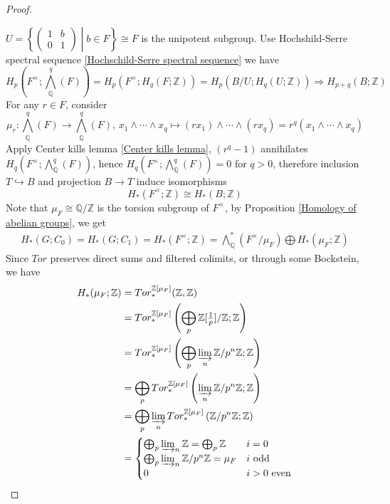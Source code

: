 \documentclass[../main.tex]{subfiles}
\begin{document}
\begin{proof}
\begin{center}
\begin{tikzcd}
\end{tikzcd}
\end{center}
$U=\left\{\begin{pmatrix}
1&b \\
0&1
\end{pmatrix}\middle|b\in F\right\}\cong F$ is the unipotent subgroup. Use Hochshild-Serre spectral sequence \ref{Hochschild-Serre spectral sequence} we have
\[H_p(F^\times;\textstyle\bigwedge_{\mathbb Q}^q(F))=H_p(F^\times;H_q(F;\mathbb Z))=H_p(B/U;H_q(U;\mathbb Z))\Rightarrow H_{p+q}(B;\mathbb Z)\]
For any $r\in F$, consider
\[\mu_r:\textstyle\bigwedge_{\mathbb Q}^q(F)\to\bigwedge_{\mathbb Q}^q(F),\,x_1\wedge\cdots\wedge x_q\mapsto (rx_1)\wedge\cdots\wedge (rx_q)=r^q(x_1\wedge\cdots\wedge x_q)\]
Apply Center kills lemma \ref{Center kills lemma}, $(r^q-1)$ annihilates $H_q(F^\times;\bigwedge_{\mathbb Q}^q(F))$, hence $H_q(F^\times;\bigwedge_{\mathbb Q}^q(F))=0$ for $q>0$, therefore inclusion $T\hookrightarrow B$ and projection $B\to T$ induce isomorphisms
\[H_*(F^\times;\mathbb Z)\cong H_*(B;\mathbb Z)\]
Note that $\mu_{F}\cong\mathbb Q/\mathbb Z$ is the torsion subgroup of $F^\times$, by Proposition \ref{Homology of abelian groups}, we get
\begin{align*}
H_*(G;C_0)=H_*(G;C_1)=H_*(F^\times;\mathbb Z)=\textstyle\bigwedge^*_{\mathbb Q}(F^\times/\mu_{F})\bigoplus H_*(\mu_{F};\mathbb Z)
\end{align*}
Since $Tor$ preserves direct sums and filtered colimits, or through some Bockstein, we have
\begin{align*}
H_*(\mu_{F};\mathbb Z)&= Tor^{\mathbb Z[\mu_{F}]}_*(\mathbb Z,\mathbb Z) \\
&=Tor^{\mathbb Z[\mu_{F}]}_*\left(\bigoplus_p\mathbb Z[\textstyle\frac{1}{p}]/\mathbb Z;\mathbb Z\right) \\
&=Tor^{\mathbb Z[\mu_{F}]}_*\left(\bigoplus_p\varinjlim_n\mathbb Z/p^n\mathbb Z;\mathbb Z\right) \\
&=\bigoplus_pTor^{\mathbb Z[\mu_{F}]}_*\left(\varinjlim_n\mathbb Z/p^n\mathbb Z;\mathbb Z\right) \\
&=\bigoplus_p\varinjlim_nTor^{\mathbb Z[\mu_{F}]}_*\left(\mathbb Z/p^n\mathbb Z;\mathbb Z\right) \\
&=\begin{cases}
\bigoplus_p\varinjlim_n\mathbb Z=\bigoplus_p\mathbb Z &i=0 \\
\bigoplus_p\varinjlim_n\mathbb Z/p^n\mathbb Z=\mu_{F} &i\text{ odd} \\
0 &i>0\text{ even}
\end{cases}

\end{align*}
\end{proof}
\end{document}
